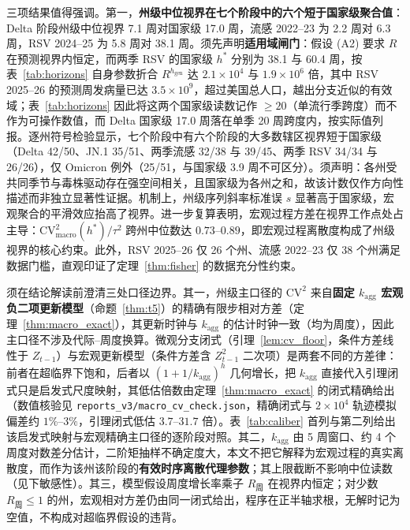 \documentclass[11pt,a4paper]{article}
\theoremstyle{plain}
\theoremstyle{definition}
\begin{document}
三项结果值得强调。第一，\textbf{州级中位视界在七个阶段中的六个短于国家级聚合值}：Delta 阶段州级中位视界 7.1 周对国家级 17.0 周，流感 2022--23 为 2.2 周对 6.3 周，RSV 2024--25 为 5.8 周对 38.1 周。须先声明\textbf{适用域闸门}：假设 (A2) 要求 $R$ 在预测视界内恒定，而两季 RSV 的国家级 $h^*$ 分别为 38.1 与 60.4 周，按表~\ref{tab:horizons} 自身参数折合 $R^{h_{\text{gen}}}$ 达 $2.1\times10^4$ 与 $1.9\times10^6$ 倍，其中 RSV 2025--26 的预测周发病量已达 $3.5\times10^9$，超过美国总人口，越出分支近似的有效域；表~\ref{tab:horizons} 因此将这两个国家级读数记作 $\ge 20$（单流行季跨度）而不作为可操作数值，而 Delta 国家级 17.0 周落在单季 20 周跨度内，按实际值列报。逐州符号检验显示，七个阶段中有六个阶段的大多数辖区视界短于国家级（Delta 42/50、JN.1 35/51、两季流感 32/38 与 39/45、两季 RSV 34/34 与 26/26），仅 Omicron 例外（25/51，与国家级 3.9 周不可区分）。须声明：各州受共同季节与毒株驱动存在强空间相关，且国家级为各州之和，故该计数仅作方向性描述而非独立显著性证据。机制上，州级序列斜率标准误 $s$ 显著高于国家级，宏观聚合的平滑效应抬高了视界。进一步复算表明，宏观过程方差在视界工作点处占主导：$\text{CV}^2_{\text{macro}}(h^*)/\tau^2$ 跨州中位数达 $0.73$--$0.89$，即宏观过程离散度构成了州级视界的核心约束。此外，RSV 2025--26 仅 26 个州、流感 2022--23 仅 38 个州满足数据门槛，直观印证了定理~\ref{thm:fisher} 的数据充分性约束。

须在结论解读前澄清三处口径边界。其一，州级主口径的 $\text{CV}^2$ 来自\textbf{固定 $k_{\text{agg}}$ 宏观负二项更新模型}（命题~\ref{thm:t5}）的精确有限步相对方差（定理~\ref{thm:macro_exact}），其更新时钟与 $k_{\text{agg}}$ 的估计时钟一致（均为周度），因此主口径不涉及代际--周度换算。微观分支闭式（引理~\ref{lem:cv_floor}，条件方差线性于 $Z_{t-1}$）与宏观更新模型（条件方差含 $Z_{t-1}^2$ 二次项）是两套不同的方差律：前者在超临界下饱和，后者以 $(1+1/k_{\text{agg}})^h$ 几何增长，把 $k_{\text{agg}}$ 直接代入引理闭式只是启发式尺度映射，其低估倍数由定理~\ref{thm:macro_exact} 的闭式精确给出（数值核验见 \texttt{reports\_v3/macro\_cv\_check.json}，精确闭式与 $2\times10^4$ 轨迹模拟偏差约 $1\%$--$3\%$，引理闭式低估 $3.7$--$31.7$ 倍）。表~\ref{tab:caliber} 首列与第二列给出该启发式映射与宏观精确主口径的逐阶段对照。其二，$k_{\text{agg}}$ 由 5 周窗口、约 4 个周度对数差分估计，二阶矩抽样不确定度大，本文不把它解释为宏观过程的真实离散度，而作为该州该阶段的\textbf{有效时序离散代理参数}；其上限截断不影响中位读数（见下敏感性）。其三，模型假设周度增长率乘子 $R_{\text{周}}$ 在视界内恒定；对少数 $R_{\text{周}} \le 1$ 的州，宏观相对方差仍由同一闭式给出，程序在正半轴求根，无解时记为空值，不构成对超临界假设的违背。
\end{document}
